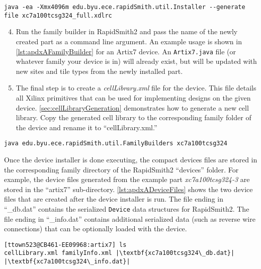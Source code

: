 \begin{lstlisting}[numbers=none, caption=RapidSmith2 device installer example
usage, label=lst:apdxAInstaller] 
java -ea -Xmx4096m edu.byu.ece.rapidSmith.util.Installer --generate file xc7a100tcsg324_full.xdlrc
\end{lstlisting}

\begin{enumerate}
\setcounter{enumi}{3}
\item Run the family builder in RapidSmith2 and pass the name of the newly
created part as a command line argument. An example usage is shown in
\autoref{lst:apdxAFamilyBuilder} for an Artix7 device. An \texttt{Artix7.java}
file (or whatever family your device is in) will already exist, but will be
updated with new sites and tile types from the newly installed part.

\item The final step is to create a \textit{cellLibrary.xml} file for the
device. This file details all Xilinx primitives that can be used for
implementing designs on the given device. \autoref{sec:cellLibraryGeneration}
demonstrates how to generate a new cell library. Copy the generated cell library
to the corresponding family folder of the device and rename it to
``cellLibrary.xml.''

\end{enumerate}

\begin{lstlisting}[numbers=none, caption=Family builder example usage,
label=lst:apdxAFamilyBuilder] 
java edu.byu.ece.rapidSmith.util.FamilyBuilders xc7a100tcsg324
\end{lstlisting}

\vspace{.3cm}

\noindent Once the device installer is done executing, the compact devices files
are stored in the corresponding family directory of the RapidSmith2 ``devices''
folder. For example, the device files generated from the example part
\textit{xc7a100tcsg324-3} are stored in the ``artix7'' sub-directory.
\autoref{lst:apdxADeviceFiles} shows the two device files that are created
after the device installer is run. The file ending in ``\_db.dat'' contains the
serialized \texttt{Device} data structures for RapidSmith2. The file ending in
``\_info.dat'' contains additional serialized data (such as reverse wire
connections) that can be optionally loaded with the device.

\begin{lstlisting}[numbers=none, caption=Generated RapidSmith2 device files,
label=lst:apdxADeviceFiles] 
[ttown523@CB461-EE09968:artix7] ls
cellLibrary.xml familyInfo.xml |\textbf{xc7a100tcsg324\_db.dat}| |\textbf{xc7a100tcsg324\_info.dat}|
\end{lstlisting} 


